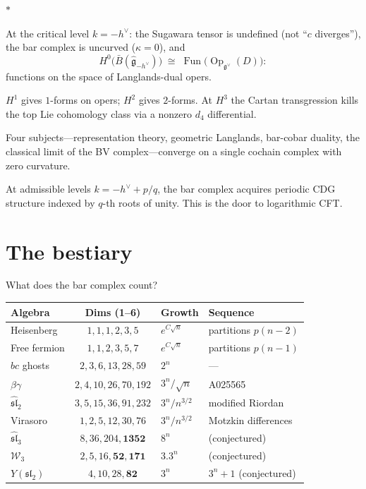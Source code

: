 \documentclass[11pt]{article}
\newcommand{\cW}{\mathcal{W}}
\newcommand{\fg}{\mathfrak{g}}
\newcommand{\fsl}{\mathfrak{sl}}
\newcommand{\B}{\bar{B}}
\newcommand{\Op}{\operatorname{Op}}
\newcommand{\Fun}{\operatorname{Fun}}
\newcommand{\sep}{\bigskip\begin{center}$*$\end{center}\medskip}
\begin{document}
\sep

At the critical level $k = -h^\vee$: the Sugawara tensor is
undefined (not ``$c$ diverges''), the bar complex is uncurved
($\kappa = 0$), and
\[
H^0\bigl(\B(\widehat{\fg}_{-h^\vee})\bigr)
\;\cong\;
\Fun\bigl(\Op_{\fg^\vee}(D)\bigr):
\]
functions on the space of Langlands-dual opers.

$H^1$ gives $1$-forms on opers; $H^2$ gives $2$-forms.  At $H^3$
the Cartan transgression kills the top Lie cohomology class via
a nonzero $d_4$ differential.

Four subjects---representation theory, geometric Langlands,
bar-cobar duality, the classical limit of the BV complex---converge
on a single cochain complex with zero curvature.

At admissible levels $k = -h^\vee + p/q$, the bar complex acquires
periodic CDG structure indexed by $q$-th roots of unity.  This is
the door to logarithmic CFT.


\section{The bestiary}
\label{sec:bestiary}

What does the bar complex count?

\begin{center}
\small
\renewcommand{\arraystretch}{1.15}
\begin{tabular}{lcll}
\textbf{Algebra} & \textbf{Dims (1--6)}
  & \textbf{Growth} & \textbf{Sequence}\\
\hline
Heisenberg & $1,1,1,2,3,5$ & $e^{C\sqrt{n}}$
  & partitions $p(n{-}2)$ \\
Free fermion & $1,1,2,3,5,7$ & $e^{C\sqrt{n}}$
  & partitions $p(n{-}1)$ \\
$bc$ ghosts & $2,3,6,13,28,59$ & $2^n$
  & --- \\
$\beta\gamma$ & $2,4,10,26,70,192$ & $3^n/\sqrt{n}$
  & A025565 \\
$\widehat{\fsl}_2$ & $3,5,15,36,91,232$ & $3^n/n^{3/2}$
  & modified Riordan \\
Virasoro & $1,2,5,12,30,76$ & $3^n/n^{3/2}$
  & Motzkin differences \\
$\widehat{\fsl}_3$ & $8,36,204,\mathbf{1352}$
  & $8^n$ & (conjectured) \\
$\cW_3$ & $2,5,16,\mathbf{52},\mathbf{171}$
  & $3.3^n$ & (conjectured) \\
$Y(\fsl_2)$ & $4,10,28,\mathbf{82}$
  & $3^n$ & $3^n + 1$ (conjectured)
\end{tabular}
\end{center}
\end{document}
